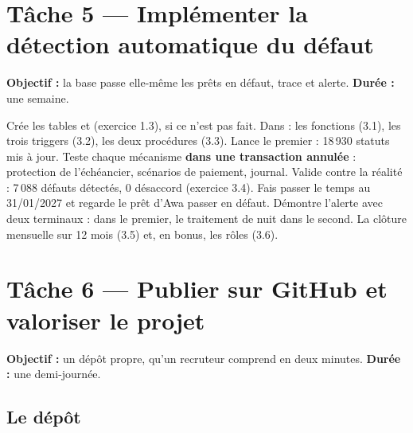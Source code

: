 \section{Tâche 5 --- Implémenter la détection automatique du défaut}

\textbf{Objectif :} la base passe elle-même les prêts en défaut, trace et alerte. \textbf{Durée :} une
semaine.

\begin{itemize}[label={}, leftmargin=1.2em]
\tache Crée les tables  et  (exercice 1.3), si ce
n'est pas fait.
\tache Dans  : les fonctions (3.1), les trois triggers (3.2), les deux
procédures (3.3).
\tache Lance le premier  : 18\,930 statuts mis à jour.
\tache Teste chaque mécanisme \textbf{dans une transaction annulée} : protection de l'échéancier, scénarios
de paiement, journal.
\tache Valide contre la réalité : 7\,088 défauts détectés, 0 désaccord (exercice 3.4).
\tache Fais passer le temps au 31/01/2027 et regarde le prêt d'Awa passer en défaut.
\tache Démontre l'alerte avec deux terminaux :  dans le premier, le traitement
de nuit dans le second.
\tache La clôture mensuelle sur 12 mois (3.5) et, en bonus, les rôles (3.6).
\end{itemize}

\section{Tâche 6 --- Publier sur GitHub et valoriser le projet}

\textbf{Objectif :} un dépôt propre, qu'un recruteur comprend en deux minutes. \textbf{Durée :} une
demi-journée.

\subsection{Le dépôt}

